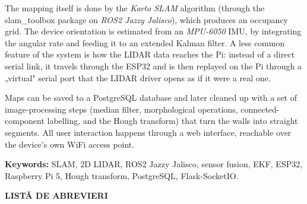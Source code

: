 \documentclass[a4paper,12pt,twoside,openany]{report}
\begin{document}
The mapping itself is done by the \textit{Karto SLAM} algorithm (through the
slam\_toolbox package on \textit{ROS2 Jazzy Jalisco}), which produces an
occupancy grid. The device orientation is estimated from an \textit{MPU-6050}
IMU, by integrating the angular rate and feeding it to an extended Kalman
filter. A less common feature of the system is how the LIDAR data reaches the
Pi: instead of a direct serial link, it travels through the ESP32 and is then
replayed on the Pi through a „virtual" serial port that the LIDAR driver opens
as if it were a real one.

Maps can be saved to a PostgreSQL database and later cleaned up with a set of
image-processing steps (median filter, morphological operations,
connected-component labelling, and the Hough transform) that turn the walls
into straight segments. All user interaction happens through a web interface,
reachable over the device's own WiFi access point.

\medskip

\noindent\textbf{Keywords:} SLAM, 2D LIDAR, ROS2 Jazzy Jalisco, sensor
fusion, EKF, ESP32, Raspberry Pi 5, Hough transform, PostgreSQL,
Flask-SocketIO.

\clearpage

\thispagestyle{coperta}
\renewcommand{\contentsname}{CUPRINS}
\tableofcontents
\clearpage

\thispagestyle{coperta}
\vspace*{12pt}
\begin{center}{\fontsize{14pt}{17pt}\bfseries LISTĂ DE ABREVIERI}\end{center}
\vspace{12pt}
\end{document}
